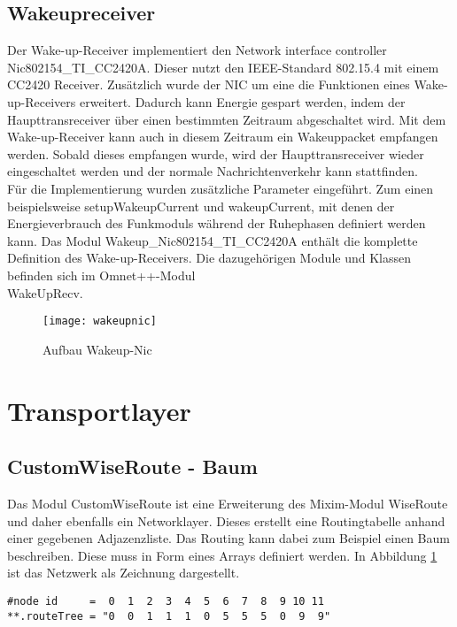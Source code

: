 \subsection{Wakeupreceiver}

Der Wake-up-Receiver implementiert den Network interface controller\\ Nic802154\_TI\_CC2420A. Dieser nutzt den IEEE-Standard 802.15.4 mit einem CC2420 Receiver. Zusätzlich wurde der NIC um eine die Funktionen eines Wake-up-Receivers erweitert. Dadurch kann Energie gespart werden, indem der Haupttransreceiver über einen bestimmten Zeitraum abgeschaltet wird. Mit dem Wake-up-Receiver kann auch in diesem Zeitraum ein Wakeuppacket empfangen werden. Sobald dieses empfangen wurde, wird der Haupttransreceiver wieder eingeschaltet werden und der normale Nachrichtenverkehr kann stattfinden.\\
Für die Implementierung wurden zusätzliche Parameter eingeführt. Zum einen beispielsweise setupWakeupCurrent und wakeupCurrent, mit denen der Energieverbrauch des Funkmoduls während der Ruhephasen definiert werden kann. Das Modul Wakeup\_Nic802154\_TI\_CC2420A enthält die komplette Definition des Wake-up-Receivers. Die dazugehörigen Module und Klassen befinden sich im Omnet++-Modul \\ WakeUpRecv.

\begin{figure}[htbp]
\centering
\caption{Aufbau Wakeup-Nic}
\label{fig:routingbsp}
\texttt{[image: wakeupnic]}
\end{figure}

\section{Transportlayer}
\subsection{CustomWiseRoute - Baum}
Das Modul CustomWiseRoute ist eine Erweiterung des Mixim-Modul WiseRoute und daher ebenfalls ein Networklayer. Dieses erstellt eine Routingtabelle anhand einer gegebenen Adjazenzliste. Das Routing kann dabei zum Beispiel einen Baum beschreiben. Diese muss in Form eines Arrays definiert werden. In Abbildung \ref{fig:routingbsp} ist das Netzwerk als Zeichnung dargestellt.

\begin{minipage}{\textwidth}
\begin{lstlisting}
#node id     =  0  1  2  3  4  5  6  7  8  9 10 11
**.routeTree = "0  0  1  1  1  0  5  5  5  0  9  9"
\end{lstlisting}
\end{minipage}

